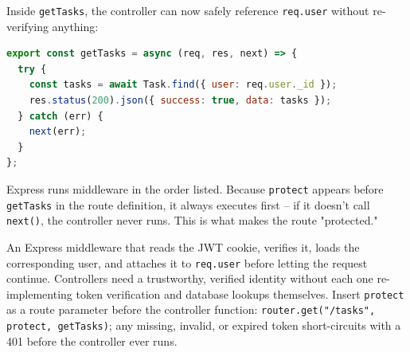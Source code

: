 Inside \texttt{getTasks}, the controller can now safely reference
\texttt{req.user} without re-verifying anything:

\begin{lstlisting}[language=JavaScript]
export const getTasks = async (req, res, next) => {
  try {
    const tasks = await Task.find({ user: req.user._id });
    res.status(200).json({ success: true, data: tasks });
  } catch (err) {
    next(err);
  }
};
\end{lstlisting}

\begin{tipbox}[TIP]
Express runs middleware in the order listed. Because \texttt{protect}
appears before \texttt{getTasks} in the route definition, it always executes
first -- if it doesn't call \texttt{next()}, the controller never runs. This
is what makes the route "protected."
\end{tipbox}

\whatwhyhow
{An Express middleware that reads the JWT cookie, verifies it, loads the corresponding user, and attaches it to \texttt{req.user} before letting the request continue.}
{Controllers need a trustworthy, verified identity without each one re-implementing token verification and database lookups themselves.}
{Insert \texttt{protect} as a route parameter before the controller function: \texttt{router.get("/tasks", protect, getTasks)}; any missing, invalid, or expired token short-circuits with a 401 before the controller ever runs.}
